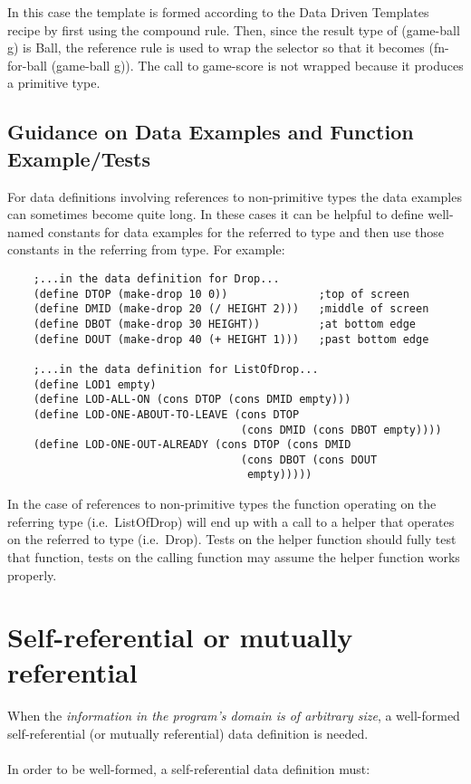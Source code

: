 \documentclass[11pt,a4paper]{report}
\begin{document}
	In this case the template is formed according to the Data Driven Templates recipe by first using
	the compound rule. Then, since the result type of (game-ball g) is Ball, the reference rule is
	used to wrap the selector so that it becomes (fn-for-ball (game-ball g)). The call to
	game-score is not wrapped because it produces a primitive type.
	
	\subsection*{Guidance on Data Examples and Function Example/Tests}
	For data definitions involving references to non-primitive types the data examples can sometimes
	become quite long. In these cases it can be helpful to define well-named constants for data examples 
	for the referred to type and then use those constants in the referring from type. For example:
	
	\begin{verbatim}
	;...in the data definition for Drop...
	(define DTOP (make-drop 10 0))              ;top of screen
	(define DMID (make-drop 20 (/ HEIGHT 2)))   ;middle of screen
	(define DBOT (make-drop 30 HEIGHT))         ;at bottom edge
	(define DOUT (make-drop 40 (+ HEIGHT 1)))   ;past bottom edge	
	
	;...in the data definition for ListOfDrop...
	(define LOD1 empty)
	(define LOD-ALL-ON (cons DTOP (cons DMID empty)))
	(define LOD-ONE-ABOUT-TO-LEAVE (cons DTOP 
	                                (cons DMID (cons DBOT empty))))
	(define LOD-ONE-OUT-ALREADY (cons DTOP (cons DMID 
	                                (cons DBOT (cons DOUT
                                 	 empty)))))
	\end{verbatim}
	
	In the case of references to non-primitive types the function operating on the referring type (i.e.\ 
	ListOfDrop) will end up with a call to a helper that operates on the referred to type (i.e.\ Drop).
	Tests on the helper function should fully test that function, tests on the calling function may
	assume the helper function works properly.
	\pagebreak
	\section{Self-referential or mutually referential} \label{sec:self_or_mut_ref}
	When the \emph{information in the program's domain is of arbitrary size}, a well-formed self-referential
	(or mutually referential) data definition is needed.
	\\ \\
	In order to be well-formed, a self-referential data definition must:
	
\end{document}
